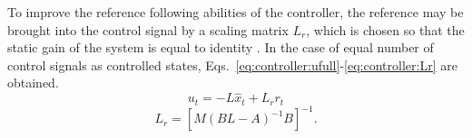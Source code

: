     To improve the reference following abilities of the controller,
    the reference may be brought into the control signal by a scaling
    matrix $L_{r}$, which is chosen so that the static gain of the
    system is equal to identity \citep{glad2003reglerteori}.
    In the case of equal number of control signals as controlled
    states, Eqs.~\ref{eq:controller:ufull}-\ref{eq:controller:Lr} are obtained.
    \begin{equation}
    \label{eq:controller:ufull}
        u_{t} = -L\hat{x}_{t} + L_{r}r_{t}
    \end{equation}
    \begin{equation}
    \label{eq:controller:Lr}
        L_{r} = \left[M(BL - A)^{-1}B\right]^{-1}.
    \end{equation}

